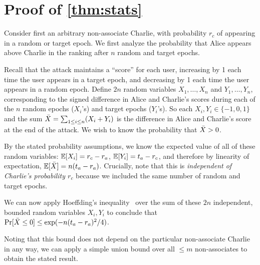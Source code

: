 \chapter{Proof of \cref{thm:stats}}\label{sec:signal-stats-proof} \OnePageChapter

Consider first an arbitrary non-associate Charlie, with probability
$r_c$ of appearing in a random or target epoch. We first analyze the
probability that Alice appears above Charlie in the ranking after $n$
random and target epochs.

Recall that the attack maintains a ``score'' for each user,
increasing by 1 each time the user appears in a target epoch, and
decreasing by 1 each time the user appears in a random epoch.
Define $2n$ random variables $X_1,\ldots,X_n$ and $Y_1,\ldots,Y_n$,
corresponding to the signed difference in Alice and Charlie's scores during
each of the $n$ random epochs ($X_i$'s) and target epochs ($Y_i$'s).
So each $X_i,Y_i \in \{-1,0,1\}$ and the sum
$\bar{X}{} = \sum_{1\le i\le n}(X_i+Y_i)$ is the difference in Alice
and Charlie's score at the end of the attack. We wish to know the
probability that $\bar{X}{} > 0$.

By the stated probability assumptions, we know the expected value of
all of these random variables: $\mathbb{E}[X_i] = r_c - r_a$,
$\mathbb{E}[Y_i] = t_a - r_c$, and therefore by linearity of expectation,
$\mathbb{E}[\bar{X}] = n(t_a - r_a)$. Crucially, note that this is
\emph{independent of Charlie's probability $r_c$} because we included
the same number of random and target epochs.

We can now apply Hoeffding's inequality~\cite{hoeffding} over the sum of these $2n$
independent, bounded random variables $X_i,Y_i$ to conclude that
$\Pr[\bar{X} \le 0] \le \exp(- n (t_a - r_a)^2 / 4)$.

Noting that this bound does not depend on the particular non-associate
Charlie in any way, we can apply a simple union bound over all $\le m$
non-associates to obtain the stated result.
